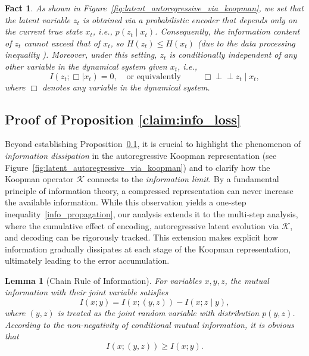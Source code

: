 \documentclass{article} %
\newtheorem{lemma}[theorem]{Lemma}
\newtheorem{fact}[theorem]{Fact}
\begin{document}
\begin{fact} \label{fact1}
    As shown in Figure~\ref{fig:latent_autoregressive_via_koopman}, we set that the latent variable $z_t$ is obtained via a probabilistic encoder that depends only on the current true state $x_t$, i.e., $p(z_t \mid x_t)$. Consequently, the information content of $z_t$ cannot exceed that of $x_t$, so $H(z_t) \le H(x_t)$ (due to the data processing inequality \citep{stone2024information}). Moreover, under this setting, $z_t$ is conditionally independent of any other variable in the dynamical system given $x_t$, i.e.,
\[
I(z_t ; \Box \mid x_t) = 0, \,\,\,\,\,\  \text{or equivalently} \,\,\ 
\qquad \Box \perp\!\!\!\perp z_t \mid x_t,
\]
where $\Box$ denotes any variable in the dynamical system.
\end{fact}

\subsection{Proof of Proposition \ref{claim:info_loss}}  \label{claim:derivation_of_information_celing}
Beyond establishing Proposition~\ref{claim:derivation_of_information_celing}, 
it is crucial to highlight the phenomenon of \emph{information dissipation} in the autoregressive Koopman representation (see Figure~\ref{fig:latent_autoregressive_via_koopman}) and to clarify how the Koopman operator $\mathcal{K}$ connects to the \textit{information limit}. 
By a fundamental principle of information theory, a compressed representation can never increase the available information. 
While this observation yields a one-step inequality~\ref{info_propagation}, our analysis extends it to the multi-step analysis, where the cumulative effect of encoding, autoregressive latent evolution via $\mathcal{K}$, and decoding can be rigorously tracked. This extension makes explicit how information gradually dissipates at each stage of the Koopman representation, ultimately leading to the error accumulation.


\begin{lemma}[Chain Rule of Information] \label{lemma:chain_of_info}
For variables $x, y, z$, the mutual information with their joint variable satisfies
\[
I(x; y) = I(x; (y,z)) - I(x; z \mid y),
\]
where $(y,z)$ is treated as the joint random variable with distribution $p(y,z)$. According to the non-negativity of conditional mutual information, it is obvious that 
\[
I(x; (y,z)) \geq I(x; y). 
\]
\end{lemma}
\end{document}
